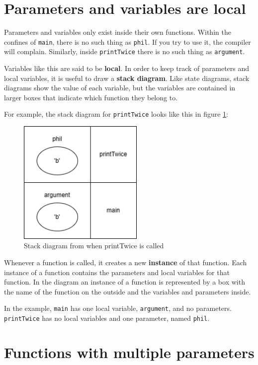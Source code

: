 \section {Parameters and variables are local}

Parameters and
variables only exist inside their own functions.  Within the
confines of {\tt main}, there is no such thing as {\tt phil}.
If you try to use it, the compiler will complain.  Similarly,
inside {\tt printTwice} there is no such thing as {\tt argument}.

Variables like this are said to be {\bf local}.  In order to
keep track of parameters and local variables, it is useful to
draw a {\bf stack diagram}.  Like state diagrams, stack diagrams
show the value of each variable, but the variables are contained
in larger boxes that indicate which function they belong to.

For example, the stack diagram for {\tt printTwice} looks like this in figure \ref{fig:stack}:

\vspace{0.1in}
\begin{figure}[h]
    \centering
    \includegraphics[height=6cm]{images/stack.png}
    \caption{Stack diagram from when printTwice is called}
    \label{fig:stack}
\end{figure}
%
Whenever a function is called, it creates a new {\bf instance}
of that function.  Each instance of a function contains the
parameters and local variables for that function.  In the
diagram an instance of a function is represented by a box
with the name of the function on the outside and the variables
and parameters inside.

In the example, {\tt main} has one local variable, {\tt argument}, and
no parameters.  {\tt printTwice} has no local variables and one
parameter, named {\tt phil}.

\section {Functions with multiple parameters}

